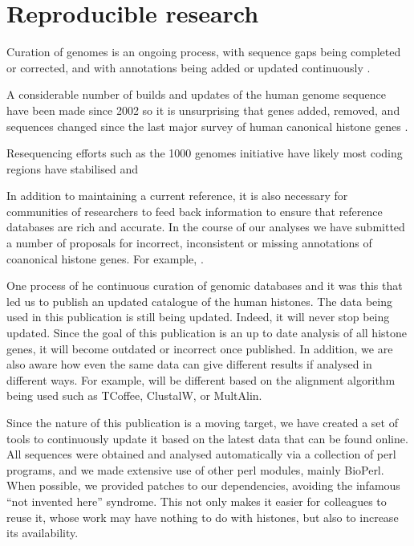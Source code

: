 \section{Reproducible research}
\label{sec:reproducible}

	Curation of genomes is an ongoing process, 
	with sequence gaps being completed or corrected,  
	and with annotations being added or updated continuously .

	A considerable number of builds and updates of the human genome sequence have been made since 2002 
	so it is unsurprising that 
	 genes added, 
	 removed, 
	and  sequences changed  
	since the last major survey of human canonical histone genes \citep{Marzluff02}.

	Resequencing efforts such as the 1000 genomes initiative have likely  most coding regions have stabilised and 

	In addition to maintaining a current reference, 
	it is also necessary for communities of researchers to feed back information 
	to ensure that reference databases are rich and accurate. 
	In the course of our analyses we have submitted a number of proposals 
	for incorrect, inconsistent or missing annotations of coanonical histone genes. 
	For example, .
	
	One  process of he continuous curation of genomic databases and it was this
  that led us to publish an updated catalogue of the human histones. The data being
  used in this publication is still being updated. Indeed, it will never stop being
  updated. Since the goal of this publication is an up to date analysis of all histone
  genes, it will become outdated or incorrect once published.
  In addition,
  we are also aware how even the same data can give different results if analysed
  in different ways. For example,  will be different based
  on the alignment algorithm being used such as TCoffee\citep{tcoffee2000},
  ClustalW\citep{clustalw2}, or MultAlin\citep{multalin1988}.

  Since the nature of this publication is a moving target, we have created a set of tools
  to continuously update it based on the latest data that can be found online.
  All sequences were obtained and analysed automatically via a collection of perl
  programs, and we made extensive use of other perl modules, mainly BioPerl\citep{bioperl}.
  When possible, we provided patches to our dependencies, avoiding the infamous
  ``not invented here'' syndrome. This not only makes it easier for colleagues to
  reuse it, whose work may have nothing to do with histones, but also to
  increase its availability.

